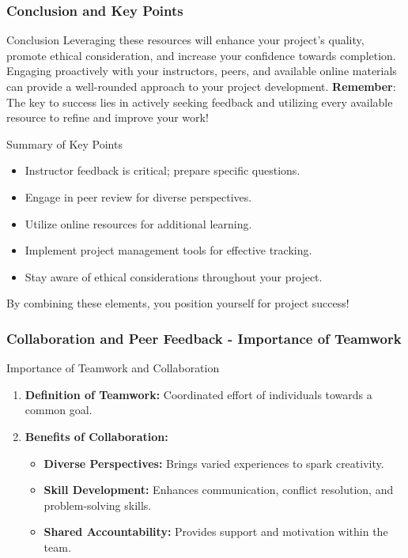 \documentclass{beamer}
\begin{document}
\begin{frame}[fragile]
    \frametitle{Conclusion and Key Points}
    \begin{block}{Conclusion}
        Leveraging these resources will enhance your project's quality, promote ethical consideration, and increase your confidence towards completion.
        Engaging proactively with your instructors, peers, and available online materials can provide a well-rounded approach to your project development.
        \textbf{Remember}: The key to success lies in actively seeking feedback and utilizing every available resource to refine and improve your work!
    \end{block}
    
    \begin{block}{Summary of Key Points}
        \begin{itemize}
            \item Instructor feedback is critical; prepare specific questions.
            \item Engage in peer review for diverse perspectives.
            \item Utilize online resources for additional learning.
            \item Implement project management tools for effective tracking.
            \item Stay aware of ethical considerations throughout your project.
        \end{itemize}
        By combining these elements, you position yourself for project success!
    \end{block}
\end{frame}

\begin{frame}[fragile]
    \frametitle{Collaboration and Peer Feedback - Importance of Teamwork}
    
    \begin{block}{Importance of Teamwork and Collaboration}
        \begin{enumerate}
            \item \textbf{Definition of Teamwork:} Coordinated effort of individuals towards a common goal.
            \item \textbf{Benefits of Collaboration:}
            \begin{itemize}
                \item \textbf{Diverse Perspectives:} Brings varied experiences to spark creativity.
                \item \textbf{Skill Development:} Enhances communication, conflict resolution, and problem-solving skills.
                \item \textbf{Shared Accountability:} Provides support and motivation within the team.
            \end{itemize}
        \end{enumerate}
    \end{block}
\end{frame}
\end{document}
